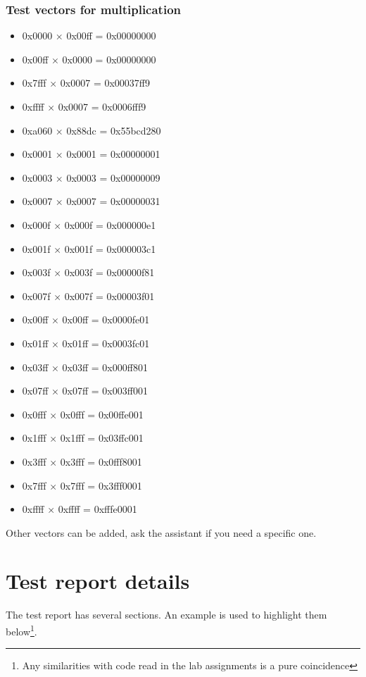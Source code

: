 \documentclass[10pt,a4paper]{article}
\theoremstyle{definition}%
\begin{document}
\subsubsection{Test vectors for multiplication}
\label{sec:vect}
{\ttfamily
\begin{itemize}
\item 0x0000 × 0x00ff = 0x00000000
\item 0x00ff × 0x0000 = 0x00000000
\item 0x7fff × 0x0007 = 0x00037ff9
\item 0xffff × 0x0007 = 0x0006fff9
\item 0xa060 × 0x88dc = 0x55bcd280
\item 0x0001 × 0x0001 = 0x00000001
\item 0x0003 × 0x0003 = 0x00000009
\item 0x0007 × 0x0007 = 0x00000031
\item 0x000f × 0x000f = 0x000000e1
\item 0x001f × 0x001f = 0x000003c1
\item 0x003f × 0x003f = 0x00000f81
\item 0x007f × 0x007f = 0x00003f01
\item 0x00ff × 0x00ff = 0x0000fe01
\item 0x01ff × 0x01ff = 0x0003fc01
\item 0x03ff × 0x03ff = 0x000ff801
\item 0x07ff × 0x07ff = 0x003ff001
\item 0x0fff × 0x0fff = 0x00ffe001
\item 0x1fff × 0x1fff = 0x03ffc001
\item 0x3fff × 0x3fff = 0x0fff8001
\item 0x7fff × 0x7fff = 0x3fff0001
\item 0xffff × 0xffff = 0xfffe0001
\end{itemize}
} Other vectors can be added, ask the assistant if you need a specific one.
\newpage

\section{Test report details}


The test report has several sections. An example is used to highlight them below\footnote{Any similarities with code read in the lab assignments is a pure coincidence}.
\end{document}
